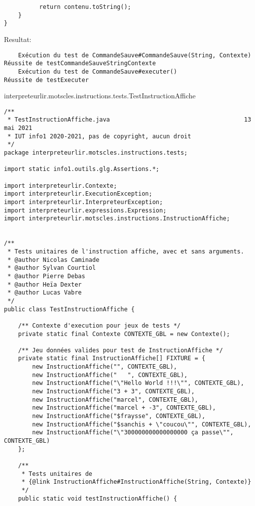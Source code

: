 \begin{enum}
\begin{verbatim}
          return contenu.toString();
    }
}
\end{verbatim}
Resultat:
\begin{verbatim}
    Exécution du test de CommandeSauve#CommandeSauve(String, Contexte)
Réussite de testCommandeSauveStringContexte
    Exécution du test de CommandeSauve#executer()
Réussite de testExecuter
\end{verbatim}

    \item interpreteurlir.motscles.instructions.tests.TestInstructionAffiche
\begin{verbatim}
/**
 * TestInstructionAffiche.java                                      13 mai 2021
 * IUT info1 2020-2021, pas de copyright, aucun droit
 */
package interpreteurlir.motscles.instructions.tests;

import static info1.outils.glg.Assertions.*;

import interpreteurlir.Contexte;
import interpreteurlir.ExecutionException;
import interpreteurlir.InterpreteurException;
import interpreteurlir.expressions.Expression;
import interpreteurlir.motscles.instructions.InstructionAffiche;


/**
 * Tests unitaires de l'instruction affiche, avec et sans arguments.
 * @author Nicolas Caminade
 * @author Sylvan Courtiol
 * @author Pierre Debas
 * @author Heïa Dexter
 * @author Lucas Vabre
 */
public class TestInstructionAffiche {
    
    /** Contexte d'execution pour jeux de tests */
    private static final Contexte CONTEXTE_GBL = new Contexte();
    
    /** Jeu données valides pour test de InstructionAffiche */
    private static final InstructionAffiche[] FIXTURE = {
        new InstructionAffiche("", CONTEXTE_GBL),
        new InstructionAffiche("   ", CONTEXTE_GBL),
        new InstructionAffiche("\"Hello World !!!\"", CONTEXTE_GBL),
        new InstructionAffiche("3 + 3", CONTEXTE_GBL),
        new InstructionAffiche("marcel", CONTEXTE_GBL),
        new InstructionAffiche("marcel + -3", CONTEXTE_GBL),
        new InstructionAffiche("$fraysse", CONTEXTE_GBL),
        new InstructionAffiche("$sanchis + \"coucou\"", CONTEXTE_GBL),
        new InstructionAffiche("\"300000000000000000 ça passe\"", CONTEXTE_GBL)
    };
    
    /** 
     * Tests unitaires de 
     * {@link InstructionAffiche#InstructionAffiche(String, Contexte)} 
     */
    public static void testInstructionAffiche() {
        

\end{verbatim}
\end{enum}
